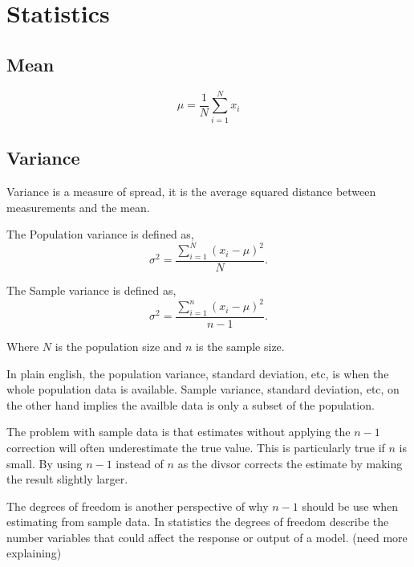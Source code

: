 \chapter{Statistics}



\section{Mean}

\begin{equation}
  \mu = \dfrac{1}{N} \sum_{i=1}^{N} x_{i}
\end{equation}



\section{Variance}

Variance is a measure of spread, it is the average squared distance between
measurements and the mean.

The Population variance is defined as,
%
\begin{equation}
  \sigma^{2} = \dfrac{\sum_{i=1}^{N} (x_i - \mu)^{2}}{N}.
\end{equation}

The Sample variance is defined as,
%
\begin{equation}
  \sigma^{2} = \dfrac{\sum_{i=1}^{n} (x_i - \mu)^{2}}{n - 1}.
\end{equation}

Where $N$ is the population size and $n$ is the sample size.

In plain english, the population variance, standard deviation, etc, is when the
whole population data is available. Sample variance, standard deviation, etc,
on the other hand implies the availble data is only a subset of the population.

The problem with sample data is that estimates without applying the $n - 1$
correction will often underestimate the true value. This is particularly true
if $n$ is small. By using $n - 1$ instead of $n$ as the divsor corrects the
estimate by making the result slightly larger.

The degrees of freedom is another perspective of why $n - 1$ should be use when
estimating from sample data. In statistics the degrees of freedom describe the
number variables that could affect the response or output of a model. (need
more explaining)



